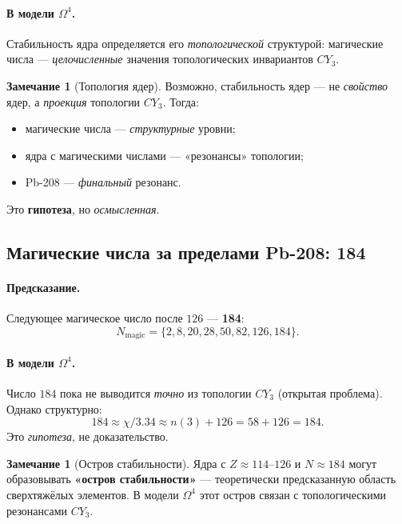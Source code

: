 \documentclass[11pt,a4paper]{article}
\newcommand{\CY}{CY_3}
\newcommand{\Om}{\Omega^4}
\theoremstyle{definition}
\newtheorem{remark}[theorem]{Замечание}
\begin{document}
\paragraph{В модели $\Om$.}
Стабильность ядра определяется его \emph{топологической} 
структурой: магические числа — \emph{целочисленные} 
значения топологических инвариантов $\CY$.

\begin{remark}[Топология ядер]
\label{rem:topology-nuclei}
Возможно, стабильность ядер — не \emph{свойство} ядер, а 
\emph{проекция} топологии $\CY$. Тогда:
\begin{itemize}
    \item магические числа — \emph{структурные} уровни;
    \item ядра с магическими числами — «резонансы» 
          топологии;
    \item Pb-208 — \emph{финальный} резонанс.
\end{itemize}
Это \textbf{гипотеза}, но \emph{осмысленная}.
\end{remark}

\subsection{Магические числа за пределами Pb-208: 184}
\label{subsec:magic-beyond}

\paragraph{Предсказание.}
Следующее магическое число после $126$ — \textbf{184}:
\begin{equation}
    N_{\text{magic}} = \{2, 8, 20, 28, 50, 82, 126, 184\}.
\end{equation}

\paragraph{В модели $\Om$.}
Число $184$ пока не выводится \emph{точно} из топологии $\CY$ 
(открытая проблема). Однако структурно:
\begin{equation}
    184 \approx \chi / 3.34 \approx n(3) + 126 = 58 + 126 = 184.
\end{equation}
Это \emph{гипотеза}, не доказательство.

\begin{remark}[Остров стабильности]
\label{rem:island-stability}
Ядра с $Z \approx 114$--$126$ и $N \approx 184$ могут образовывать 
\textbf{«остров стабильности»} — теоретически предсказанную 
область сверхтяжёлых элементов. В модели $\Om$ этот остров 
связан с топологическими резонансами $\CY$.
\end{remark}
\end{document}
